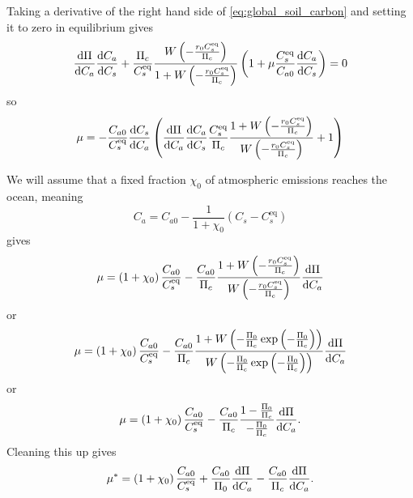 Taking a derivative of the right hand side of \cref{eq:global_soil_carbon} and setting it to zero in equilibrium gives
\begin{equation}
  \label{eq:soil_carbon_lambda}
  \dv{\Pi}{C_a}\dv{C_a}{C_s} + \frac{\Pi_c}{C_s^{\mathrm{eq}}} \frac{W\left(-\frac{r_0C_s^{\mathrm{eq}}}{\Pi_c}\right)}{1+W\left(-\frac{r_0C_s^{\mathrm{eq}}}{\Pi_c}\right)} \left(
    1 + \mu \frac{C_s^{\mathrm{eq}}}{C_{a0}} \dv{C_a}{C_s}\right) = 0
\end{equation}
so
\begin{equation}
  \label{eq:critical_mu}
  \mu = -\frac{C_{a0}}{C_{s}^{\mathrm{eq}}}\dv{C_s}{C_a}\left(\dv{\Pi}{C_a}\dv{C_a}{C_s} \frac{C_s^{\mathrm{eq}}}{\Pi_c}\frac{1+W\left(-\frac{r_0C_s^{\mathrm{eq}}}{\Pi_c}\right)}{W\left(-\frac{r_0C_s^{\mathrm{eq}}}{\Pi_c}\right)} + 1 \right)
\end{equation}

We will assume  that a fixed fraction $\chi_0$ of atmospheric emissions reaches the ocean, meaning
\begin{equation}
  \label{eq:simple_ocean}
  C_a = C_{a0} -\frac{1}{1+\chi_0} (C_s - C_{s}^{\mathrm{eq}})
\end{equation}
gives
\begin{equation}
  \label{eq:critical_mu_simple_ocean}
  \mu = \left(1+\chi_0\right) \frac{C_{a0}}{C_{s}^{\mathrm{eq}}} -
  \frac{C_{a0}}{\Pi_c}\frac{1+W\left(-\frac{r_0C_s^{\mathrm{eq}}}{\Pi_c}\right)}{W\left(-\frac{r_0C_s^{\mathrm{eq}}}{\Pi_c}\right)}\dv{\Pi}{C_a}
\end{equation}
or
\begin{equation*}
  \mu = \left(1+\chi_0\right) \frac{C_{a0}}{C_{s}^{\mathrm{eq}}} -
  \frac{C_{a0}}{\Pi_c}
  \frac{1+W\left(-\frac{\Pi_0}{\Pi_c}\exp\left(-\frac{\Pi_0}{\Pi_c}\right)\right)}
  {W\left(-\frac{\Pi_0}{\Pi_c}\exp\left(-\frac{\Pi_0}{\Pi_c}\right)\right)}\dv{\Pi}{C_a} 
\end{equation*}
or
\begin{equation*}
  \mu = \left(1+\chi_0\right) \frac{C_{a0}}{C_{s}^{\mathrm{eq}}} -
  \frac{C_{a0}}{\Pi_c}
  \frac{1-\frac{\Pi_0}{\Pi_c}}{-\frac{\Pi_0}{\Pi_c}}\dv{\Pi}{C_a}.
\end{equation*}
Cleaning this up gives
\begin{equation}
  \label{eq:critical_mu_simple_ocean_in_terms_of_npp}
  \mu^* = \left(1+\chi_0\right) \frac{C_{a0}}{C_{s}^{\mathrm{eq}}} +
  \frac{C_{a0}}{\Pi_0} \dv{\Pi}{C_a} - \frac{C_{a0}}{\Pi_c}\dv{\Pi}{C_a}.
\end{equation}

